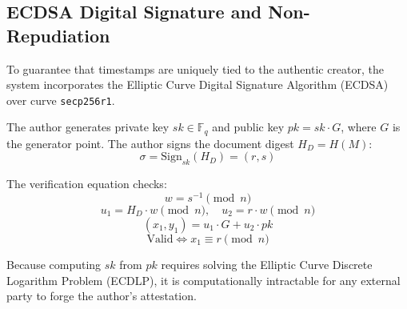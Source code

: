 \documentclass[conference]{IEEEtran}
\begin{document}
\subsection{ECDSA Digital Signature and Non-Repudiation}
To guarantee that timestamps are uniquely tied to the authentic creator, the system incorporates the Elliptic Curve Digital Signature Algorithm (ECDSA) over curve \texttt{secp256r1}.

The author generates private key $sk \in \mathbb{F}_q$ and public key $pk = sk \cdot G$, where $G$ is the generator point. The author signs the document digest $H_D = H(M)$:
\begin{equation}
\sigma = \text{Sign}_{sk}(H_D) = (r, s)
\end{equation}

The verification equation checks:
\begin{equation}
w = s^{-1} \pmod n
\end{equation}
\begin{equation}
u_1 = H_D \cdot w \pmod n, \quad u_2 = r \cdot w \pmod n
\end{equation}
\begin{equation}
(x_1, y_1) = u_1 \cdot G + u_2 \cdot pk
\end{equation}
\begin{equation}
\text{Valid} \iff x_1 \equiv r \pmod n
\end{equation}

Because computing $sk$ from $pk$ requires solving the Elliptic Curve Discrete Logarithm Problem (ECDLP), it is computationally intractable for any external party to forge the author's attestation.
\end{document}
